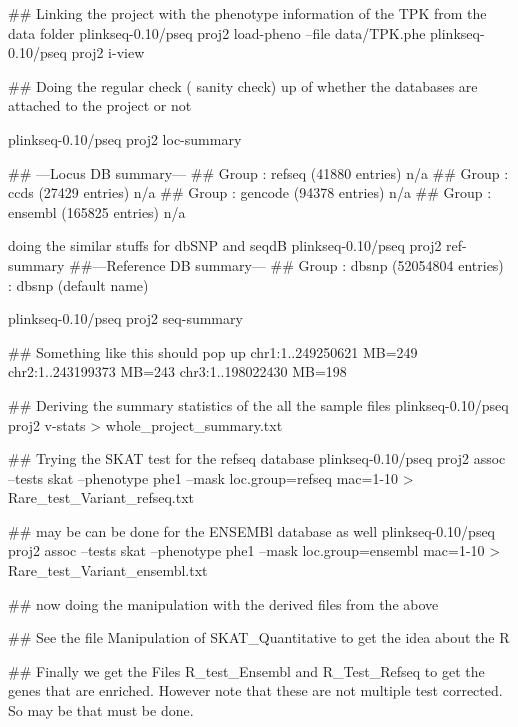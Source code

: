 ## Linking the project with the phenotype information of the TPK from the data folder
plinkseq-0.10/pseq proj2 load-pheno --file data/TPK.phe 
plinkseq-0.10/pseq proj2 i-view


## Doing the regular check ( sanity check) up of whether the databases are attached to the project or not

plinkseq-0.10/pseq proj2 loc-summary

## ---Locus DB summary---
## Group : refseq (41880 entries) n/a
## Group : ccds (27429 entries) n/a
## Group : gencode (94378 entries) n/a
## Group : ensembl (165825 entries) n/a

doing the similar stuffs for dbSNP and seqdB
plinkseq-0.10/pseq proj2 ref-summary 
##---Reference DB summary---
## Group : dbsnp (52054804 entries) : dbsnp (default name)

plinkseq-0.10/pseq proj2 seq-summary 

## Something like this should pop up
chr1:1..249250621	MB=249
chr2:1..243199373	MB=243
chr3:1..198022430	MB=198

## Deriving the summary statistics of the all the sample files
plinkseq-0.10/pseq proj2 v-stats > whole_project_summary.txt

## Trying the SKAT test for the refseq database 
 plinkseq-0.10/pseq proj2 assoc --tests skat --phenotype phe1 --mask loc.group=refseq  mac=1-10 > Rare_test_Variant_refseq.txt

## may be can be done for the ENSEMBl database as well
 plinkseq-0.10/pseq proj2 assoc --tests skat --phenotype phe1 --mask loc.group=ensembl  mac=1-10 > Rare_test_Variant_ensembl.txt

## now doing the manipulation with the derived files from the above 
 
## See the file Manipulation of SKAT_Quantitative to get the idea about the R 

## Finally we get the Files R_test_Ensembl and R_Test_Refseq to get the genes that are enriched. However note that these are not multiple test corrected. So may be that must be done.


